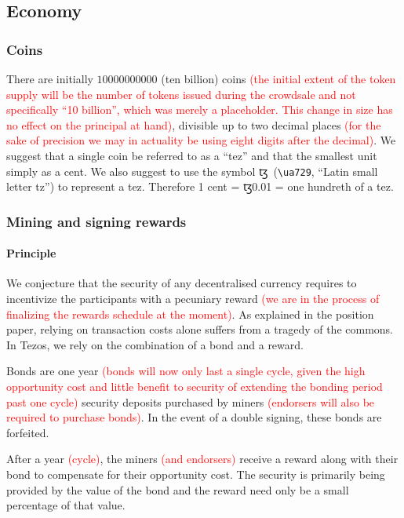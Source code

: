 \documentclass[letterpaper]{article}
\newcommand\change[1]{\textcolor{red}{#1}}
\newcommand{\tz}{{\fontspec{DejaVu Sans} \small{ꜩ}}}
\begin{document}
\subsection{Economy}

\subsubsection{Coins}
There are initially $\num{10000000000}$ (ten billion) coins \change{(the initial extent of the token supply will be the number of tokens issued during the crowdsale and not specifically “10 billion”, which was merely a placeholder. This change in size has no effect on the principal at hand)}, divisible up to two
decimal places \change{(for the sake of precision we may in actuality be using eight digits after the decimal)}. We suggest that a single coin be referred to as a ``tez''
and that the smallest unit simply as a cent. We also suggest to use the
symbol \tz~(\verb!\ua729!, ``Latin small letter tz'') to represent a tez.
Therefore 1 cent = \tz\num{0.01} = one hundreth of a tez.

\subsubsection{Mining and signing rewards}

\paragraph{Principle}
We conjecture that the security of any decentralised currency requires
to incentivize the participants with a pecuniary reward \change {(we are in the process of finalizing the rewards schedule at the moment)}. As explained in the
position paper, relying on transaction costs alone suffers from a tragedy of the
commons. In Tezos, we rely on the combination of a bond and a reward.

Bonds are one year \change {(bonds will now only last a single cycle, given the high opportunity cost and little benefit to security of extending the bonding period past one cycle)} security deposits purchased by miners \change {(endorsers will also be required to purchase bonds)}.
In the event of a double signing, these bonds are forfeited.

After a year \change {(cycle)}, the miners \change {(and endorsers)} receive a reward along with their bond to compensate
for their opportunity cost. The security is primarily being provided by the
value of the bond and the reward need only be a small percentage of that value.
\end{document}

